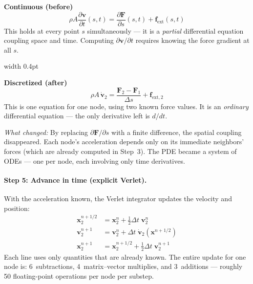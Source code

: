 \documentclass[11pt]{article}
\newcommand{\vect}[1]{\mathbf{#1}}
\newcommand{\ddt}[1]{\frac{\partial #1}{\partial t}}
\newcommand{\dds}[1]{\frac{\partial #1}{\partial s}}
\begin{document}
\begin{tcolorbox}[colback=white, colframe=black!40, title={\small Step 4 --- Continuous vs.\ discretized momentum equation}, fonttitle=\bfseries\small]
\begin{minipage}[t]{0.47\linewidth}
\centering\textbf{Continuous (before)}
\[
  \rho A \ddt{\vect{v}}(s,t) = \dds{\vect{F}}(s,t) + \vect{f}_{\text{ext}}(s,t)
\]
This holds at every point $s$ simultaneously --- it is a \emph{partial} differential equation coupling space and time.
Computing $\partial\vect{v}/\partial t$ requires knowing the force gradient at all $s$.
\end{minipage}\hfill
\vrule width 0.4pt\hfill
\begin{minipage}[t]{0.47\linewidth}
\centering\textbf{Discretized (after)}
\[
  \rho A\, \dot{\vect{v}}_2 = \frac{\vect{F}_2 - \vect{F}_1}{\Delta s} + \vect{f}_{\text{ext},2}
\]
This is one equation for one node, using two known force values.
It is an \emph{ordinary} differential equation --- the only derivative left is $d/dt$.
\end{minipage}

\smallskip
\noindent\textit{What changed:} By replacing $\partial\vect{F}/\partial s$ with a finite difference, the spatial coupling disappeared.
Each node's acceleration depends only on its immediate neighbors' forces (which are already computed in Step~3).
The PDE became a system of ODEs --- one per node, each involving only time derivatives.
\end{tcolorbox}

\paragraph{Step 5: Advance in time (explicit Verlet).}
With the acceleration known, the Verlet integrator updates the velocity and position:
\begin{align}
  \vect{x}_2^{n+1/2} &= \vect{x}_2^n + \tfrac{1}{2}\Delta t\;\vect{v}_2^n \label{eq:verlet-x-example} \\
  \vect{v}_2^{n+1} &= \vect{v}_2^n + \Delta t\;\dot{\vect{v}}_2(\vect{x}^{n+1/2}) \label{eq:verlet-v-example} \\
  \vect{x}_2^{n+1} &= \vect{x}_2^{n+1/2} + \tfrac{1}{2}\Delta t\;\vect{v}_2^{n+1} \label{eq:verlet-x2-example}
\end{align}
Each line uses only quantities that are already known.
The entire update for one node is: 6~subtractions, 4~matrix--vector multiplies, and 3~additions --- roughly 50 floating-point operations per node per substep.
\end{document}
